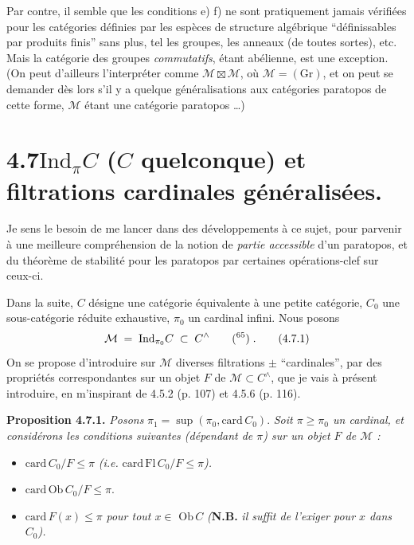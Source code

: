 \documentclass[11pt]{article}
\newcommand{\msp}[1]{\marginpar{\footnotesize [#1]}}
\newcommand{\Mc}{\mathcal{M}}
\begin{document}
\msp{page 160}

Par contre, il semble que les conditions e) f) ne sont pratiquement jamais vérifiées pour les catégories définies par les espèces de structure algébrique “définissables par produits finis” sans plus, tel les groupes, les anneaux (de toutes sortes), etc. Mais la catégorie des groupes \textit{commutatifs}, étant abélienne, est une exception. (On peut d'ailleurs l'interpréter comme $\Mc \boxtimes \Mc$, où $\Mc = (\mathrm{Gr})$, et on peut se demander dès lors s'il y a quelque généralisations aux catégories paratopos de cette forme, $\Mc$ étant une catégorie paratopos \ldots) %

\msp{page 161}

\section*{4.7\quad $\mathrm{Ind}_{\pi}C$ ($C$ quelconque) et filtrations cardinales généralisées.}

Je sens le besoin de me lancer dans des développements à ce sujet, pour parvenir à une meilleure compréhension de la notion de \textit{partie accessible} d'un paratopos, et du théorème de stabilité pour les paratopos par certaines opérations-clef sur ceux-ci.

Dans la suite, $C$ désigne une catégorie équivalente à une petite catégorie, $C_0$ une sous-catégorie réduite exhaustive, $\pi_0$ un cardinal infini. Nous posons
\[
\Mc \;=\; \mathrm{Ind}_{\pi_0}C \;\subset\; C^{\wedge} \qquad \text{(\footnotemark[65])}\;. \tag*{(4.7.1)}
\]
On se propose d'introduire sur $\Mc$ diverses filtrations $\pm$ “cardinales”, par des propriétés correspondantes sur un objet $F$ de $\Mc \subset C^{\wedge}$, que je vais à présent introduire, en m'inspirant de 4.5.2 (p. 107) et 4.5.6 (p. 116).

\textbf{Proposition 4.7.1.} \textit{Posons} $\pi_1 = \sup(\pi_0, \mathrm{card}\, C_0)$. \textit{Soit $\pi \geqslant \pi_0$ un cardinal, et considérons les conditions suivantes (dépendant de $\pi$) sur un objet $F$ de $\Mc$ :}
\begin{itemize}[leftmargin=4em]
\item[\textit{a)}] $\mathrm{card}\, C_0/F \leqslant \pi$ \textit{(i.e.} $\mathrm{card}\,\mathrm{Fl}\, C_0/F \leqslant \pi$\textit{).}
\item[\textit{a$'$)}] $\mathrm{card}\,\mathrm{Ob}\, C_0/F \leqslant \pi$.
\item[\textit{a$''$)}] $\mathrm{card}\, F(x) \leqslant \pi$ \textit{pour tout $x \in$} $\mathrm{Ob}\, C$ \textit{(}\textbf{N.B.} \textit{il suffit de l'exiger pour $x$ dans $C_0$).}
\end{itemize}
\end{document}
